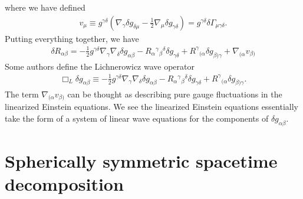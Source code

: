 \documentclass[12pt]{report}
\begin{document}
where we have defined
\begin{align}
    \label{eq:linear_v_vector}
    \boxed{
        v_{\mu}
        \equiv
        g^{\gamma\delta}
        \left(
            \nabla_{\gamma}\delta g_{\delta \mu}
            -
            \frac{1}{2}\nabla_{\mu}\delta g_{\gamma\delta}
        \right)
        =
        g^{\gamma\delta} \delta \Gamma_{\mu\gamma\delta}
        .
    }
\end{align}
Putting everything together, we have
\begin{align}
    \label{eq:general_pert_Ricci_tensor}
    \boxed{
        \delta R_{\alpha\beta}
        =
        -
        \frac{1}{2}g^{\gamma\delta}
        \nabla_{\gamma}\nabla_{\delta}\delta g_{\alpha\beta}
        -
        R_{\alpha}{}^{\gamma}{}_{\beta}{}^{\delta}\delta g_{\gamma\delta}
        +
        R^{\gamma}{}_{(\alpha}\delta g_{\beta)\gamma}
        +
        \nabla_{(\alpha}v_{\beta)}
    }
\end{align}
Some authors define the Lichnerowicz wave operator
\begin{align}
    \label{eq:Lich_wav_op}
    \Box_L \delta g_{\alpha\beta}
    \equiv
    -
    \frac{1}{2}g^{\gamma\delta}
    \nabla_{\gamma}\nabla_{\delta}\delta g_{\alpha\beta}
    -
    R_{\alpha}{}^{\gamma}{}_{\beta}{}^{\delta}\delta g_{\gamma\delta}
    +
    R^{\gamma}{}_{(\alpha}\delta g_{\beta)\gamma}
    .
\end{align}
The term $\nabla_{(\alpha}v_{\beta)}$ can be thought as 
describing pure gauge fluctuations in the linearized Einstein equations.
We see the linearized Einstein equations essentially take the
form of a system of linear wave equations for the components
of $\delta g_{\alpha\beta}$.
\chapter{Spherically symmetric spacetime decomposition}
\end{document}
